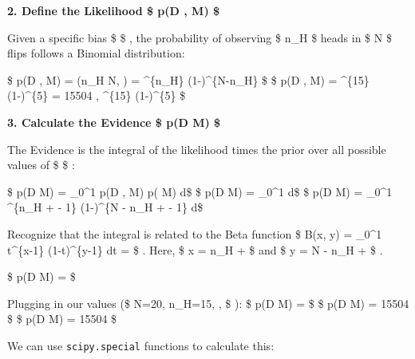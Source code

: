\documentclass[11pt]{article}
\begin{document}
\textbf{2. Define the Likelihood \$ p(D \textbar{} \theta, M) \$ }

Given a specific bias \$ \theta \$ , the probability of observing \$
n\_H \$ heads in \$ N \$ flips follows a Binomial distribution:

\$ p(D \textbar{} \theta, M) = (n\_H \textbar{} N,
\theta) =  \theta\^{}\{n\_H\} (1-\theta)\^{}\{N-n\_H\} \$
\$ p(D \textbar{} \theta, M) =  \theta\^{}\{15\}
(1-\theta)\^{}\{5\} = 15504 , \theta\^{}\{15\} (1-\theta)\^{}\{5\} \$

\textbf{3. Calculate the Evidence \$ p(D \textbar{} M) \$ }

The Evidence is the integral of the likelihood times the prior over all
possible values of \$ \theta \$ :

\$ p(D \textbar{} M) = \int\_0\^{}1 p(D \textbar{} \theta, M)
p(\theta \textbar{} M) d\theta \$ \$ p(D \textbar{} M) = \int\_0\^{}1
  d\theta \$
\$ p(D \textbar{} M) = 
\frac{\Gamma(\alpha+\beta)}{\Gamma(\alpha)\Gamma(\beta)} \int\_0\^{}1
\theta\^{}\{n\_H + \alpha - 1\} (1-\theta)\^{}\{N - n\_H + \beta - 1\}
d\theta \$

Recognize that the integral is related to the Beta function \$ B(x, y) =
\int\_0\^{}1 t\^{}\{x-1\} (1-t)\^{}\{y-1\} dt =
 \$ . Here, \$ x = n\_H +
\alpha \$ and \$ y = N - n\_H + \beta \$ .

\$ p(D \textbar{} M) = 
\frac{\Gamma(\alpha+\beta)}{\Gamma(\alpha)\Gamma(\beta)}
\$

Plugging in our values (\$ N=20, n\_H=15, ,  \$ ): \$ p(D
\textbar{} M) =  
 \$ \$ p(D
\textbar{} M) = 15504 \times {}
\times {} \$ \$ p(D \textbar{} M) =
15504  \times {} \$

We can use \texttt{scipy.special} functions to calculate this:
\end{document}
